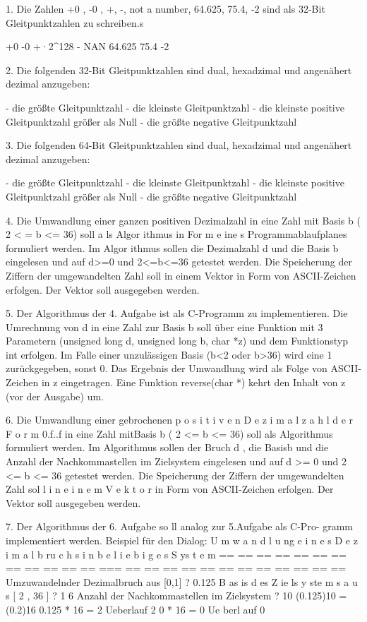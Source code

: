 \documentclass[12pt,a4paper]{scrreprt}
\begin{document}
1. Die Zahlen +0 , -0 , +\infty , -\infty, not a number, 64.625, 75.4, -2 sind als 32-Bit Gleitpunktzahlen zu schreiben.s

    +0
    -0
    +·2^128
    -\infty 
    NAN
    64.625
    75.4
    -2
    

2. Die folgenden 32-Bit Gleitpunktzahlen sind dual, hexadzimal und angenähert dezimal anzugeben:

- die größte Gleitpunktzahl
- die kleinste Gleitpunktzahl
- die kleinste positive Gleitpunktzahl größer als Null
- die größte negative Gleitpunktzahl

3. Die folgenden 64-Bit Gleitpunktzahlen sind dual, hexadzimal und angenähert dezimal anzugeben:

- die größte Gleitpunktzahl
- die kleinste Gleitpunktzahl
- die kleinste positive Gleitpunktzahl größer als Null
- die größte negative Gleitpunktzahl

4. Die Umwandlung einer ganzen positiven Dezimalzahl in eine Zahl mit Basis b ( 2 < = b <= 36) soll a ls Algor ithmus in For m e ine s Programmablaufplanes formuliert werden. Im Algor ithmus sollen die Dezimalzahl d und die Basis b eingelesen und auf d>=0 und 2<=b<=36
getestet werden. Die Speicherung der Ziffern der umgewandelten Zahl soll in einem Vektor in Form von ASCII-Zeichen erfolgen. Der Vektor soll ausgegeben werden.

5. Der Algorithmus der 4. Aufgabe ist als C-Programm zu implementieren. Die Umrechnung von d in eine Zahl zur Basis b soll über eine Funktion mit 3 Parametern (unsigned long d, unsigned long b, char *z) und dem Funktionstyp int erfolgen. Im Falle einer unzulässigen Basis (b<2 oder b>36) wird eine 1 zurückgegeben, sonst 0. Das Ergebnis der Umwandlung wird als Folge von ASCII-Zeichen in z eingetragen. Eine Funktion
reverse(char *) kehrt den Inhalt von z (vor der Ausgabe) um.

6. Die Umwandlung einer gebrochenen p o s i t i v e n D e z i m a l z a h l d e r F o r m
0.f..f in eine Zahl mitBasis b ( 2 <= b <= 36) soll als Algorithmus
formuliert werden. Im Algorithmus sollen der Bruch d , die Basisb und
die Anzahl der Nachkommastellen im Zielsystem eingelesen und auf
d >= 0 und 2 <= b <= 36 getestet werden. Die Speicherung der Ziffern
der umgewandelten Zahl sol l i n e i n e m V e k t o r in Form von ASCII-Zeichen
erfolgen. Der Vektor soll ausgegeben werden.

7. Der Algorithmus der 6. Aufgabe so ll analog zur 5.Aufgabe als C-Pro-
gramm implementiert werden. Beispiel für den Dialog:
U m w a n d l u ng e i n e s D e z i m a l b ru c h s i n b e l i e b i g e s S ys t e m
== == == == == == == == == == == == === == == == == == == == == == == == ==
Umzuwandelnder Dezimalbruch aus [0,1] ? 0.125
B as is d es Z ie ls y ste m s a u s [ 2 , 36 ] ? 1 6
Anzahl der Nachkommastellen im Zielsystem ? 10
(0.125)10 = (0.2)16
0.125 * 16 =
2 Ueberlauf 2
0 * 16 =
0 Ue berl auf 0
\end{document}
